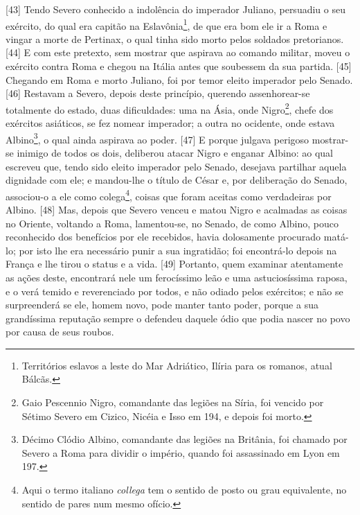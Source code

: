{[}43{]} Tendo Severo conhecido a indolência do imperador Juliano,
persuadiu o seu exército, do qual era capitão na Eslavônia\footnote{Territórios
  eslavos a leste do Mar Adriático, Ilíria para os romanos, atual
  Bálcãs.}, de que era bom ele ir a Roma e vingar a morte de Pertinax, o
qual tinha sido morto pelos soldados pretorianos. {[}44{]} E com este
pretexto, sem mostrar que aspirava ao comando militar, moveu o exército
contra Roma e chegou na Itália antes que soubessem da sua partida.
{[}45{]} Chegando em Roma e morto Juliano, foi por temor eleito
imperador pelo Senado. {[}46{]} Restavam a Severo, depois deste
princípio, querendo assenhorear-se totalmente do estado, duas
dificuldades: uma na Ásia, onde Nigro\footnote{Gaio Pescennio Nigro,
  comandante das legiões na Síria, foi vencido por Sétimo Severo em
  Cizico, Nicéia e Isso em 194, e depois foi morto.}, chefe dos
exércitos asiáticos, se fez nomear imperador; a outra no ocidente, onde
estava Albino\footnote{Décimo Clódio Albino, comandante das legiões na
  Britânia, foi chamado por Severo a Roma para dividir o império, quando
  foi assassinado em Lyon em 197.}, o qual ainda aspirava ao poder.
{[}47{]} E porque julgava perigoso mostrar-se inimigo de todos os dois,
deliberou atacar Nigro e enganar Albino: ao qual escreveu que, tendo
sido eleito imperador pelo Senado, desejava partilhar aquela dignidade
com ele; e mandou-lhe o título de César e, por deliberação do Senado,
associou-o a ele como colega\footnote{Aqui o termo italiano
  \emph{collega} tem o sentido de posto ou grau equivalente, no sentido
  de pares num mesmo ofício.}, coisas que foram aceitas como verdadeiras
por Albino. {[}48{]} Mas, depois que Severo venceu e matou Nigro e
acalmadas as coisas no Oriente, voltando a Roma, lamentou-se, no Senado,
de como Albino, pouco reconhecido dos benefícios por ele recebidos,
havia dolosamente procurado matá-lo; por isto lhe era necessário punir a
sua ingratidão; foi encontrá-lo depois na França e lhe tirou o status e
a vida. {[}49{]} Portanto, quem examinar atentamente as ações deste,
encontrará nele um ferocíssimo leão e uma astuciosíssima raposa, e o
verá temido e reverenciado por todos, e não odiado pelos exércitos; e
não se surpreenderá se ele, homem novo, pode manter tanto poder, porque
a sua grandíssima reputação sempre o defendeu daquele ódio que podia
nascer no povo por causa de seus roubos.

